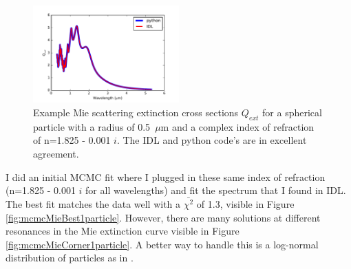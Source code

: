 \documentclass[manuscript]{aastex6}
\begin{document}
\begin{figure}
\begin{centering}
\includegraphics[width=0.5\textwidth]{python_vs_IDL_example.pdf}
\caption{Example Mie scattering extinction cross sections $Q_{ext}$ for a spherical particle with a radius of 0.5~$\mu$m and a complex index of refraction of n=1.825 - 0.001 $i$. The IDL and python code's are in excellent agreement.}\label{fig:IDLvsPython}
\end{centering}
\end{figure}

I did an initial MCMC fit where I plugged in these same index of refraction (n=1.825 - 0.001 $i$ for all wavelengths) and fit the spectrum that I found in IDL.
The best fit matches the data well with a $\bar{\chi^2}$ of 1.3, visible in Figure \ref{fig:mcmcMieBest1particle}.
However, there are many solutions at different resonances in the Mie extinction curve visible in Figure \ref{fig:mcmcMieCorner1particle}.
A better way to handle this is a log-normal distribution of particles as in \citet{2016ApJ...826..156S}.
\end{document}
